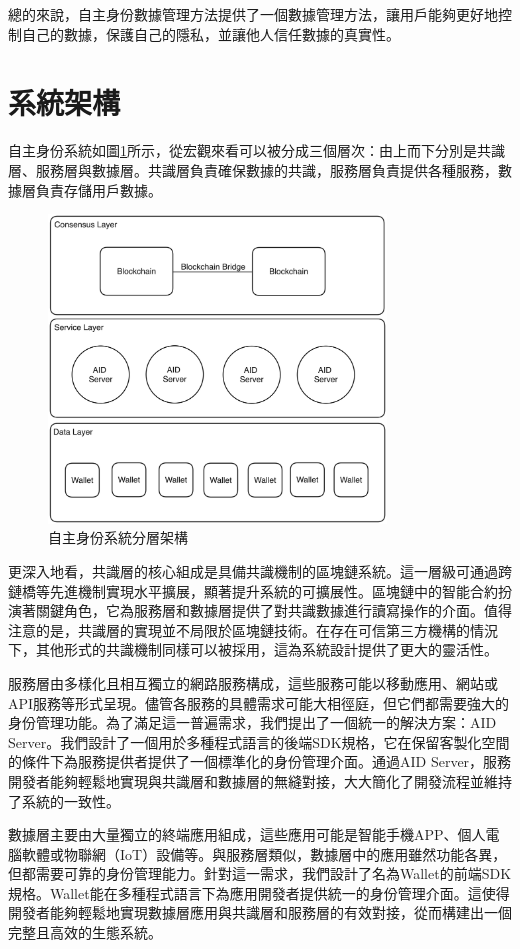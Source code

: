 總的來說，自主身份數據管理方法提供了一個數據管理方法，讓用戶能夠更好地控制自己的數據，保護自己的隱私，並讓他人信任數據的真實性。\newpage
\section{系統架構}
自主身份系統如圖\ref{fig:aid-layers}所示，從宏觀來看可以被分成三個層次：由上而下分別是共識層、服務層與數據層。共識層負責確保數據的共識，服務層負責提供各種服務，數據層負責存儲用戶數據。
\begin{figure}
  \centering
  \includegraphics[width=0.8\textwidth]{figures/aidLayers.png}
  \caption{自主身份系統分層架構}
  \label{fig:aid-layers}
\end{figure}

更深入地看，共識層的核心組成是具備共識機制的區塊鏈系統。這一層級可通過跨鏈橋等先進機制實現水平擴展，顯著提升系統的可擴展性。區塊鏈中的智能合約扮演著關鍵角色，它為服務層和數據層提供了對共識數據進行讀寫操作的介面。值得注意的是，共識層的實現並不局限於區塊鏈技術。在存在可信第三方機構的情況下，其他形式的共識機制同樣可以被採用，這為系統設計提供了更大的靈活性。

服務層由多樣化且相互獨立的網路服務構成，這些服務可能以移動應用、網站或API服務等形式呈現。儘管各服務的具體需求可能大相徑庭，但它們都需要強大的身份管理功能。為了滿足這一普遍需求，我們提出了一個統一的解決方案：AID Server。我們設計了一個用於多種程式語言的後端SDK規格，它在保留客製化空間的條件下為服務提供者提供了一個標準化的身份管理介面。通過AID Server，服務開發者能夠輕鬆地實現與共識層和數據層的無縫對接，大大簡化了開發流程並維持了系統的一致性。

數據層主要由大量獨立的終端應用組成，這些應用可能是智能手機APP、個人電腦軟體或物聯網（IoT）設備等。與服務層類似，數據層中的應用雖然功能各異，但都需要可靠的身份管理能力。針對這一需求，我們設計了名為Wallet的前端SDK規格。Wallet能在多種程式語言下為應用開發者提供統一的身份管理介面。這使得開發者能夠輕鬆地實現數據層應用與共識層和服務層的有效對接，從而構建出一個完整且高效的生態系統。

